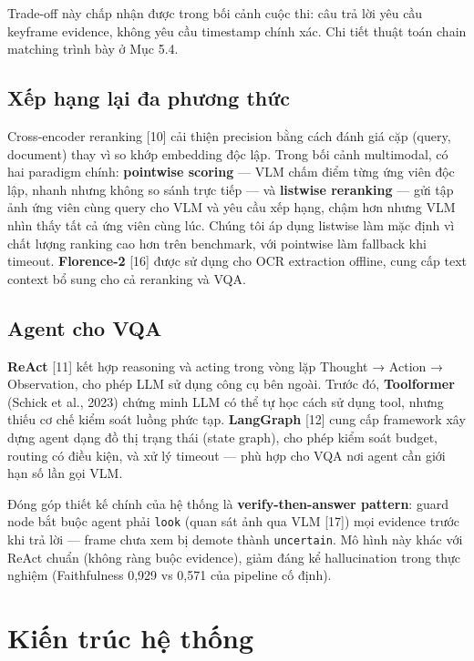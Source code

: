 \documentclass[12pt,a4paper,onecolumn]{article}
\begin{document}
Trade-off này chấp nhận được trong bối cảnh cuộc thi: câu trả lời yêu cầu keyframe evidence, không yêu cầu timestamp chính xác. Chi tiết thuật toán chain matching trình bày ở Mục 5.4.

\subsection{Xếp hạng lại đa phương thức}

Cross-encoder reranking [10] cải thiện precision bằng cách đánh giá cặp (query, document) thay vì so khớp embedding độc lập. Trong bối cảnh multimodal, có hai paradigm chính: \textbf{pointwise scoring} — VLM chấm điểm từng ứng viên độc lập, nhanh nhưng không so sánh trực tiếp — và \textbf{listwise reranking} — gửi tập ảnh ứng viên cùng query cho VLM và yêu cầu xếp hạng, chậm hơn nhưng VLM nhìn thấy tất cả ứng viên cùng lúc. Chúng tôi áp dụng listwise làm mặc định vì chất lượng ranking cao hơn trên benchmark, với pointwise làm fallback khi timeout. \textbf{Florence-2} [16] được sử dụng cho OCR extraction offline, cung cấp text context bổ sung cho cả reranking và VQA.

\subsection{Agent cho VQA}

\textbf{ReAct} [11] kết hợp reasoning và acting trong vòng lặp Thought → Action → Observation, cho phép LLM sử dụng công cụ bên ngoài. Trước đó, \textbf{Toolformer} (Schick et al., 2023) chứng minh LLM có thể tự học cách sử dụng tool, nhưng thiếu cơ chế kiểm soát luồng phức tạp. \textbf{LangGraph} [12] cung cấp framework xây dựng agent dạng đồ thị trạng thái (state graph), cho phép kiểm soát budget, routing có điều kiện, và xử lý timeout — phù hợp cho VQA nơi agent cần giới hạn số lần gọi VLM.

Đóng góp thiết kế chính của hệ thống là \textbf{verify-then-answer pattern}: guard node bắt buộc agent phải \texttt{look} (quan sát ảnh qua VLM [17]) mọi evidence trước khi trả lời — frame chưa xem bị demote thành \texttt{uncertain}. Mô hình này khác với ReAct chuẩn (không ràng buộc evidence), giảm đáng kể hallucination trong thực nghiệm (Faithfulness 0,929 vs 0,571 của pipeline cố định).

\section{Kiến trúc hệ thống}
\end{document}
